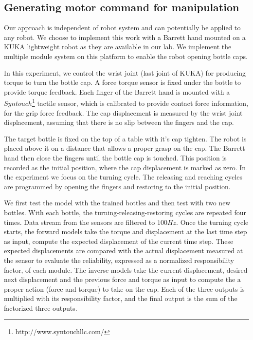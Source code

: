 \documentclass[preprint,12pt]{elsarticle}
\begin{document}
\subsection{Generating motor command for manipulation}
\label{sec:command}
Our approach is independent of robot system and can potentially be applied to any robot. We choose to implement this work with a Barrett hand mounted on a KUKA lightweight robot as they are available in our lab. We implement the multiple module system on this platform to enable the robot opening bottle caps.

In this experiment, we control the wrist joint (last joint of KUKA) for producing torque to turn the bottle cap. A force torque sensor is fixed under the bottle to provide torque feedback. Each finger of the Barrett hand is mounted with a $Syntouch$\footnote{http://www.syntouchllc.com/} tactile sensor, which is calibrated to provide contact force information, for the grip force feedback. The cap displacement is measured by the wrist joint displacement, assuming that there is no slip between the fingers and the cap.

The target bottle is fixed on the top of a table with it's cap tighten. The robot is placed above it on a distance that allows a proper grasp on the cap. The Barrett hand then close the fingers until the bottle cap is touched. This position is recorded as the initial position, where the cap displacement is marked as zero. In the experiment we focus on the turning cycle. The releasing and reaching cycles are programmed by opening the fingers and restoring to the initial position.

We first test the model with the trained bottles and then test with two new bottles. With each bottle, the turning-releasing-restoring cycles are repeated four times. Data stream from the sensors are filtered to $100Hz$. Once the turning cycle starts, the forward models take the torque and displacement at the last time step as input, compute the expected displacement of the current time step. These expected displacements are compared with the actual displacement measured at the sensor to evaluate the reliability, expressed as a normalized responsibility factor, of each module. The inverse models take the current displacement, desired next displacement and the previous force and torque as input to compute the a proper action (force and torque) to take on the cap. Each of the three outputs is multiplied with its responsibility factor, and the final output is the sum of the factorized three outputs.
\end{document}
